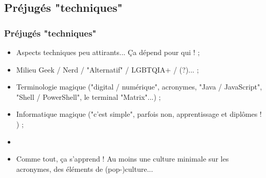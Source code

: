 \documentclass[slidetop,11pt]{beamer}
\begin{document}
\subsection{Pr{\'e}jug{\'e}s "techniques"}
\begin{frame}
	\frametitle{Pr{\'e}jug{\'e}s "techniques"}
	\begin{minipage}{0.82\textwidth}
		\begin{itemize}
			\item Aspects techniques peu attirants... \c{C}a d{\'e}pend pour qui ! ; 
			\item Milieu Geek / Nerd / "Alternatif" / LGBTQIA+ / (?)... ; %
			\item Terminologie magique ("digital / num{\'e}rique", acronymes, "Java / JavaScript", "Shell / PowerShell", le terminal "Matrix"...) ; 
			\item Informatique magique ("c'est simple", parfois non, apprentissage et dipl{\^o}mes ! ) ; 
			\item[] 
			\item Comme tout, \c{c}a s'apprend ! Au moins une culture minimale sur les acronymes, des {\'e}l{\'e}ments de (pop-)culture... 
		\end{itemize}
	\end{minipage} \hfill \begin{minipage}{0.14\textwidth}
	\end{minipage} 
\end{frame}
\end{document}
